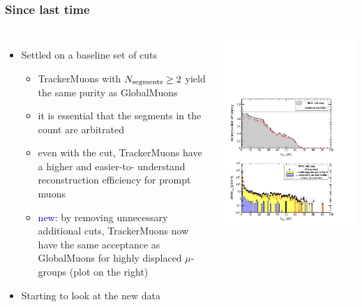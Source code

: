 \documentclass[compress]{beamer}
\newcommand{\s}[1]{{\mbox{\scriptsize #1}}}
\begin{document}
\begin{frame}
\frametitle{Since last time}
\begin{columns}
\begin{itemize}
\item Settled on a baseline set of cuts
\begin{itemize}\setlength{\itemsep}{0.1 cm}
\item TrackerMuons with $N_\s{segments} \ge 2$ yield the same purity
  as GlobalMuons
\item it is essential that the segments in the count are arbitrated
\item even with the cut, TrackerMuons have a higher and easier-to-
  understand reconstruction efficiency for prompt muons
\item \textcolor{darkblue}{new:} by removing unnecessary additional
  cuts, TrackerMuons now have the same acceptance as GlobalMuons for
  highly displaced $\mu$-groups (plot on the right)
\end{itemize}
\item Starting to look at the new data
\end{itemize}

\includegraphics[width=\linewidth]{dispvert_TrackerSegMatch2.pdf}
\end{columns}
\end{frame}
\end{document}
